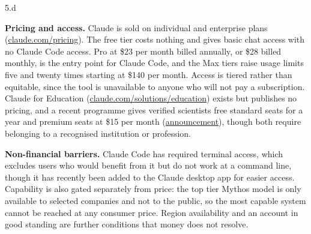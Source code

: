 \LARGE
5.d
\normalsize

\begin{answer}
  \textbf{Pricing and access.} Claude is sold on individual and enterprise plans
  (\href{https://claude.com/pricing}{claude.com/pricing}). The free tier costs nothing and gives
  basic chat access with no Claude Code access. Pro at \$23 per month billed annually, or \$28
  billed monthly, is the entry point for Claude Code, and the Max tiers raise usage limits five and
  twenty times starting at \$140 per month. Access is tiered rather than equitable, since the tool
  is unavailable to anyone who will not pay a subscription. Claude for Education
  (\href{https://claude.com/solutions/education}{claude.com/solutions/education}) exists but
  publishes no pricing, and a recent programme gives verified scientists free standard seats for a
  year and premium seats at \$15 per month
  (\href{https://www.anthropic.com/news/expanding-support-for-scientists}{announcement}), though
  both require belonging to a recognised institution or profession.

  \medskip
  \textbf{Non-financial barriers.} Claude Code has required terminal access, which excludes users
  who would benefit from it but do not work at a command line, though it has recently been added to
  the Claude desktop app for easier access. Capability is also gated separately from price: the top
  tier Mythos model is only available to selected companies and not to the public, so the most
  capable system cannot be reached at any consumer price. Region availability and an account in
  good standing are further conditions that money does not resolve.


\end{answer}
